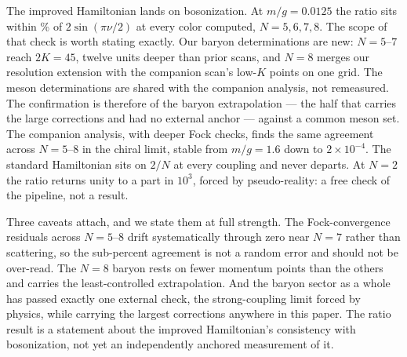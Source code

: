 The improved Hamiltonian lands on bosonization.  At $m/g = 0.0125$ the
ratio sits within \numRatioWorstDevPct\% of $2\sin(\pi\nu/2)$ at every
color computed, $N = 5, 6, 7, 8$.  The scope of that check is worth
stating exactly.  Our baryon determinations are new: $N = 5$--$7$ reach
$2K = 45$, twelve units deeper than prior scans, and $N = 8$ merges our
resolution extension with the companion scan's low-$K$ points on one
grid.  The meson determinations are shared with the companion analysis,
not remeasured.  The confirmation is therefore of the baryon
extrapolation --- the half that carries the large corrections and had no
external anchor --- against a common meson set.  The companion analysis,
with deeper Fock checks, finds the same agreement across $N = 5$--$8$ in
the chiral limit, stable from $m/g = 1.6$ down to $2\times10^{-4}$.  The standard Hamiltonian sits on
$2/N$ at every coupling and never departs.  At $N = 2$ the ratio returns
unity to a part in $10^{3}$, forced by pseudo-reality: a free check of the
pipeline, not a result.

Three caveats attach, and we state them at full strength.  The
Fock-convergence residuals across $N = 5$--$8$ drift systematically
through zero near $N = 7$ rather than scattering, so the sub-percent
agreement is not a random error and should not be over-read.  The $N = 8$
baryon rests on fewer momentum points than the others and carries the
least-controlled extrapolation.  And the baryon sector as a whole has
passed exactly one external check, the strong-coupling limit forced by
physics, while carrying the largest corrections anywhere in this paper.
The ratio result is a statement about the improved Hamiltonian's
consistency with bosonization, not yet an independently anchored
measurement of it.

